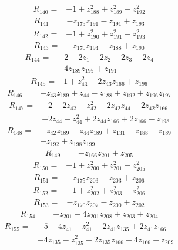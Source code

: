 \begin{align*}
R_{140}={}&-1+z_{188}^{2}+z_{189}^{2}-z_{192}^{2}
\end{align*}
\begin{align*}
R_{141}={}&-z_{175}z_{191}-z_{191}+z_{193}
\end{align*}
\begin{align*}
R_{142}={}&-1+z_{190}^{2}+z_{191}^{2}-z_{193}^{2}
\end{align*}
\begin{align*}
R_{143}={}&-z_{170}z_{194}-z_{188}+z_{190}
\end{align*}
\begin{align*}
R_{144}={}&-2-2z_{1}-2z_{2}-2z_{3}-2z_{4}\\
&-4z_{189}z_{195}+z_{191}
\end{align*}
\begin{align*}
R_{145}={}&1+z_{43}^{2}-2z_{43}z_{166}+z_{196}
\end{align*}
\begin{align*}
R_{146}={}&-z_{43}z_{189}+z_{44}-z_{188}+z_{192}+z_{196}z_{197}
\end{align*}
\begin{align*}
R_{147}={}&-2-2z_{42}-z_{42}^{2}-2z_{42}z_{44}+2z_{42}z_{166}\\
&-2z_{44}-z_{44}^{2}+2z_{44}z_{166}+2z_{166}-z_{198}
\end{align*}
\begin{align*}
R_{148}={}&-z_{42}z_{189}-z_{44}z_{189}+z_{131}-z_{188}-z_{189}\\
&+z_{192}+z_{198}z_{199}
\end{align*}
\begin{align*}
R_{149}={}&-z_{166}z_{201}+z_{205}
\end{align*}
\begin{align*}
R_{150}={}&-1+z_{200}^{2}+z_{201}^{2}-z_{205}^{2}
\end{align*}
\begin{align*}
R_{151}={}&-z_{175}z_{203}-z_{203}+z_{206}
\end{align*}
\begin{align*}
R_{152}={}&-1+z_{202}^{2}+z_{203}^{2}-z_{206}^{2}
\end{align*}
\begin{align*}
R_{153}={}&-z_{170}z_{207}-z_{200}+z_{202}
\end{align*}
\begin{align*}
R_{154}={}&-z_{201}-4z_{201}z_{208}+z_{203}+z_{204}
\end{align*}
\begin{align*}
R_{155}={}&-5-4z_{41}-z_{41}^{2}-2z_{41}z_{135}+2z_{41}z_{166}\\
&-4z_{135}-z_{135}^{2}+2z_{135}z_{166}+4z_{166}-z_{209}
\end{align*}
